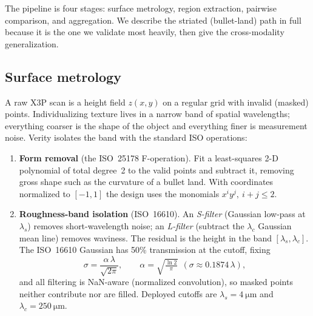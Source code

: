 \documentclass[11pt]{article}
\begin{document}
The pipeline is four stages: surface metrology, region extraction, pairwise
comparison, and aggregation. We describe the striated (bullet-land) path in full
because it is the one we validate most heavily, then give the cross-modality
generalization.

\subsection{Surface metrology}
\label{sec:metrology}
A raw X3P scan is a height field $z(x,y)$ on a regular grid with invalid (masked)
points. Individualizing texture lives in a narrow band of spatial wavelengths;
everything coarser is the shape of the object and everything finer is measurement
noise. Verity isolates the band with the standard ISO operations:

\begin{enumerate}
  \item \textbf{Form removal} (the ISO~25178 F-operation). Fit a least-squares 2-D
        polynomial of total degree~2 to the valid points and subtract it, removing
        gross shape such as the curvature of a bullet land. With coordinates
        normalized to $[-1,1]$ the design uses the monomials $x^i y^j,\ i+j\le 2$.
  \item \textbf{Roughness-band isolation} (ISO~16610). An \emph{S-filter}
        (Gaussian low-pass at $\lambda_s$) removes short-wavelength noise; an
        \emph{L-filter} (subtract the $\lambda_c$ Gaussian mean line) removes
        waviness. The residual is the height in the band $[\lambda_s,\lambda_c]$.
        The ISO~16610 Gaussian has 50\% transmission at the cutoff, fixing
        \begin{equation}
          \sigma = \frac{\alpha\,\lambda}{\sqrt{2\pi}},
          \qquad \alpha=\sqrt{\tfrac{\ln 2}{\pi}}\ \ (\sigma\approx 0.1874\,\lambda),
          \label{eq:isosigma}
        \end{equation}
        and all filtering is NaN-aware (normalized convolution), so masked points
        neither contribute nor are filled. Deployed cutoffs are
        $\lambda_s=\SI{4}{\micro\meter}$ and $\lambda_c=\SI{250}{\micro\meter}$.
\end{enumerate}
\end{document}
